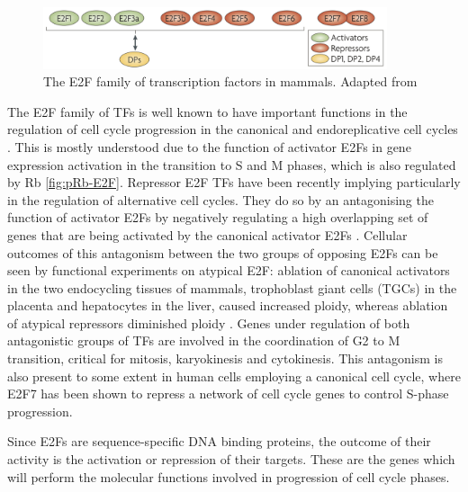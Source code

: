 \documentclass[11pt,twoside,a4paper]{report}
\begin{document}
				\begin{figure}[here]
					\centering
					\includegraphics[width=0.9\textwidth]{pngs/E2F_family.png}
					\caption[The E2F family of transcription factors in mammals]
					{The E2F family of transcription factors in mammals. {\footnotesize Adapted from \cite{VandenHeuvel2008}}}
					\label{fig:E2F_family}
					\vspace{-20pt}
				\end{figure}
				
				The E2F family of TFs is well known to have important functions in the regulation of cell cycle progression in the canonical and endoreplicative cell cycles \cite{Moon2008}\cite{Li2008}\cite{Chen2012}. This is mostly understood due to the function of activator E2Fs in gene expression activation in the transition to S and M phases, which is also regulated by Rb \ref{fig:pRb-E2F}. Repressor E2F TFs have been recently implying particularly in the regulation of alternative cell cycles. They do so by an antagonising the function of activator E2Fs by negatively regulating a high overlapping set of genes that are being activated by the canonical activator E2Fs \cite{Li2008}. Cellular outcomes of this antagonism between the two groups of opposing E2Fs can be seen by functional experiments on atypical E2F: ablation of canonical activators in the two endocycling tissues of mammals, trophoblast giant cells (TGCs) in the placenta and hepatocytes in the liver, caused increased ploidy, whereas ablation of atypical repressors diminished ploidy \cite{Chen2012}. Genes under regulation of both antagonistic groups of TFs are involved in the coordination of G2 to M transition, critical for mitosis, karyokinesis and cytokinesis. This antagonism is also present to some extent in human cells employing a canonical cell cycle, where E2F7 has been shown to repress a network of cell cycle genes to control S-phase progression.\cite{Westendorp2012}
				
				Since E2Fs are sequence-specific DNA binding proteins, the outcome of their activity is the activation or repression of their targets. These are the genes which will perform the molecular functions involved in progression of cell cycle phases.
				
\end{document}
